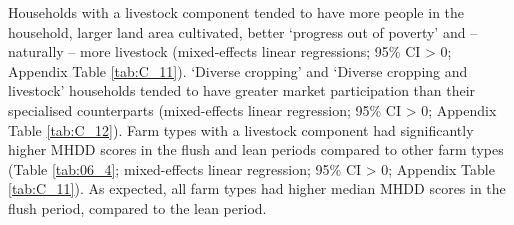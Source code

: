 Households with a livestock component tended to have more people in the household, larger land area cultivated, better `progress out of poverty' and -- naturally -- more livestock (mixed-effects linear regressions; 95\% CI > 0; Appendix Table \ref{tab:C_11}). `Diverse cropping' and `Diverse cropping and livestock' households tended to have greater market participation than their specialised counterparts (mixed-effects linear regression; 95\% CI > 0; Appendix Table \ref{tab:C_12}). Farm types with a livestock component had significantly higher MHDD scores in the flush and lean periods compared to other farm types (Table \ref{tab:06_4}; mixed-effects linear regression; 95\% CI > 0; Appendix Table \ref{tab:C_11}). As expected, all farm types had higher median MHDD scores in the flush period, compared to the lean period.



